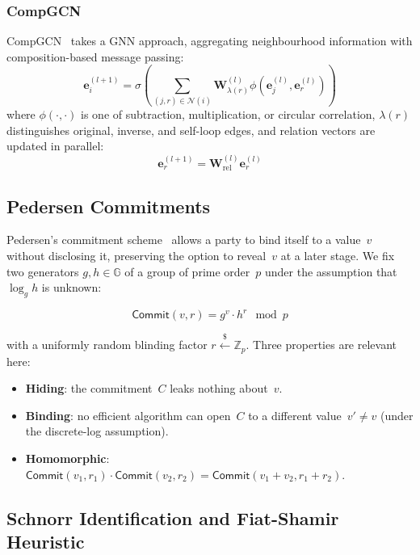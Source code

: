 \documentclass[conference, 10pt]{IEEEtran}
\newcommand{\Z}{\mathbb{Z}}
\newcommand{\G}{\mathbb{G}}
\newcommand{\Commit}{\mathsf{Commit}}
\newcommand{\embed}{\mathbf{e}}
\newcommand{\vect}[1]{\mathbf{#1}}
\begin{document}
\subsubsection{CompGCN}
CompGCN~\cite{vashishth2020composition} takes a GNN approach, aggregating neighbourhood information with composition-based message passing:
\begin{equation}
    \embed_i^{(l+1)} = \sigma\!\left( \sum_{(j,r) \in \mathcal{N}(i)} \vect{W}_{\lambda(r)}^{(l)} \phi(\embed_j^{(l)}, \embed_r^{(l)}) \right)
    \label{eq:compgcn}
\end{equation}
where $\phi(\cdot, \cdot)$ is one of subtraction, multiplication, or circular correlation, $\lambda(r)$ distinguishes original, inverse, and self-loop edges, and relation vectors are updated in parallel:
\begin{equation}
    \embed_r^{(l+1)} = \vect{W}_{\text{rel}}^{(l)} \embed_r^{(l)}
    \label{eq:compgcn_rel}
\end{equation}

\subsection{Pedersen Commitments}

Pedersen's commitment scheme~\cite{pedersen1991non} allows a party to bind itself to a value~$v$ without disclosing it, preserving the option to reveal~$v$ at a later stage. We fix two generators $g, h \in \G$ of a group of prime order~$p$ under the assumption that $\log_g h$ is unknown:

\begin{equation}
    \Commit(v, r) = g^v \cdot h^r \mod p
    \label{eq:pedersen}
\end{equation}

with a uniformly random blinding factor $r \xleftarrow{\$} \Z_p$. Three properties are relevant here:
\begin{itemize}
    \item \textbf{Hiding}: the commitment~$C$ leaks nothing about~$v$.
    \item \textbf{Binding}: no efficient algorithm can open~$C$ to a different value~$v' \neq v$ (under the discrete-log assumption).
    \item \textbf{Homomorphic}: $\Commit(v_1, r_1) \cdot \Commit(v_2, r_2) = \Commit(v_1 + v_2, r_1 + r_2)$.
\end{itemize}

\subsection{Schnorr Identification and Fiat-Shamir Heuristic}
\end{document}

